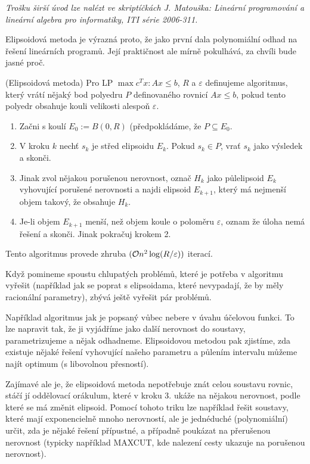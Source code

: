 {\it Trošku širší úvod lze nalézt ve skriptíčkách J. Matouška: Lineární
programování a lineární algebra pro informatiky, ITI série 2006-311.}

Elipsoidová metoda je výrazná proto, že jako první dala polynomiální odhad na
řešení lineárních programů. Její praktičnost ale mírně pokulhává, za chvíli bude
jasné proč.

\alg (Elipsoidová metoda) Pro LP $\max c^Tx: Ax \leq b$, $R$ a $\varepsilon$
definujeme algoritmus, který vrátí nějaký bod polyedru $P$ definovaného rovnicí $Ax \leq b$,
pokud tento polyedr obsahuje kouli velikosti alespoň $\varepsilon$.
\begin{enumerate}
	\item Začni s koulí $E_0 := B(0, R)$ (předpokládáme, že $P \subseteq E_0$.
	\item V kroku $k$ nechť $s_k$ je střed elipsoidu $E_k$. Pokud $s_k \in P$,
	vrať $s_k$ jako výsledek a skonči.
	\item Jinak zvol nějakou porušenou nerovnost, označ $H_k$ jako půlelipsoid
	$E_k$ vyhovující porušené nerovnosti a najdi elipsoid $E_{k+1}$, který má
	nejmenší objem takový, že obsahuje $H_k$.
	\item Je-li objem $E_{k+1}$ menší, než objem koule o poloměru $\varepsilon$,
	oznam že úloha nemá řešení a skonči. Jinak pokračuj krokem 2.
\end{enumerate}
Tento algoritmus provede zhruba $(\mathcal{O} n^2\log (R/\varepsilon))$ iterací.

Když pomineme spoustu chlupatých problémů, které je potřeba v algoritmu vyřešit
(například jak se poprat s elipsoidama, které nevypadají, že by měly racionální
parametry), zbývá ještě vyřešit pár problémů. 

Například algoritmus jak je popsaný vůbec nebere v úvahu účelovou funkci. To lze
napravit tak, že ji vyjádříme jako další nerovnost do soustavy, parametrizujeme
a nějak odhadneme. Elipsoidovou metodou pak zjistíme, zda existuje nějaké řešení
vyhovující našeho parametru a půlením intervalu můžeme najít optimum (s
libovolnou přesností).

Zajímavé ale je, že elipsoidová metoda nepotřebuje znát celou soustavu rovnic,
stáčí jí oddělovací orákulum, které v kroku 3. ukáže na nějakou nerovnost, podle
které se má změnit elipsoid. Pomocí tohoto triku lze například řešit soustavy,
které mají exponencielně mnoho nerovností, ale je jednéduché (polynomiální)
určit, zda je nějaké řešení přípustné, a případně poukázat na přerušenou
nerovnost (typicky například MAXCUT, kde nalezení cesty ukazuje na porušenou
nerovnost).
